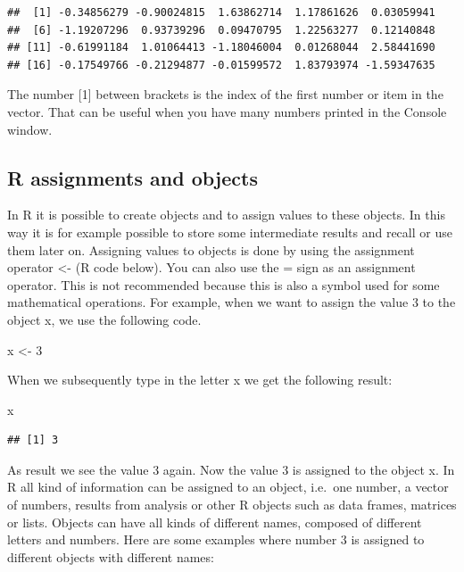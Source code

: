 \documentclass[]{book}
\newenvironment{Shaded}{\begin{snugshade}}{\end{snugshade}}
\newcommand{\DecValTok}[1]{\textcolor[rgb]{0.00,0.00,0.81}{#1}}
\newcommand{\StringTok}[1]{\textcolor[rgb]{0.31,0.60,0.02}{#1}}
\newcommand{\NormalTok}[1]{#1}
\begin{document}
\begin{verbatim}
##  [1] -0.34856279 -0.90024815  1.63862714  1.17861626  0.03059941
##  [6] -1.19207296  0.93739296  0.09470795  1.22563277  0.12140848
## [11] -0.61991184  1.01064413 -1.18046004  0.01268044  2.58441690
## [16] -0.17549766 -0.21294877 -0.01599572  1.83793974 -1.59347635
\end{verbatim}

The number {[}1{]} between brackets is the index of the first number or
item in the vector. That can be useful when you have many numbers
printed in the Console window.

\subsection{R assignments and objects}\label{r-assignments-and-objects}

In R it is possible to create objects and to assign values to these
objects. In this way it is for example possible to store some
intermediate results and recall or use them later on. Assigning values
to objects is done by using the assignment operator \textless{}- (R code
below). You can also use the = sign as an assignment operator. This is
not recommended because this is also a symbol used for some mathematical
operations. For example, when we want to assign the value 3 to the
object x, we use the following code.

\begin{Shaded}
\begin{Highlighting}[]
\NormalTok{x <-}\StringTok{ }\DecValTok{3} 
\end{Highlighting}
\end{Shaded}

When we subsequently type in the letter x we get the following result:

\begin{Shaded}
\begin{Highlighting}[]
\NormalTok{x }
\end{Highlighting}
\end{Shaded}

\begin{verbatim}
## [1] 3
\end{verbatim}

As result we see the value 3 again. Now the value 3 is assigned to the
object x. In R all kind of information can be assigned to an object,
i.e.~one number, a vector of numbers, results from analysis or other R
objects such as data frames, matrices or lists. Objects can have all
kinds of different names, composed of different letters and numbers.
Here are some examples where number 3 is assigned to different objects
with different names:
\end{document}
